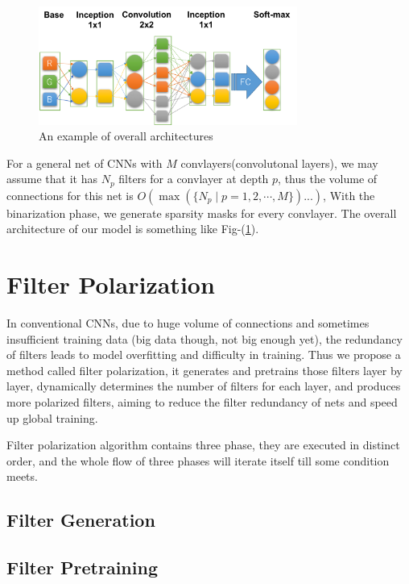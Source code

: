 \documentclass[conference]{IEEEtran}
\begin{document}
\begin{figure}
\centering
\includegraphics[width=85mm]{paper_res/arch.png}
\caption{An example of overall architectures}
\label{fig:net}
\end{figure}

For a general net of CNNs with $M$ convlayers(convolutonal layers),
we may assume that it has $N_{p}$ filters for a convlayer at depth $p$,
thus the volume of connections for this net is $O(\max(\{N_p\mid p=1,2,\cdots,M\})...)$,
With the binarization phase, we generate sparsity masks for every convlayer.
The overall architecture of our model is something like Fig-(\ref{fig:net}).


\section{Filter Polarization}
In conventional CNNs, due to huge volume of connections and sometimes insufficient training
data (big data though, not big enough yet), the redundancy of filters leads to model
overfitting and difficulty in training\cite{jaderberg2014speeding,chen2015compressing}.
Thus we propose a method called filter polarization,
it generates and pretrains those filters layer by layer, dynamically
determines the number of filters for each layer, and produces more polarized filters,
aiming to reduce the filter redundancy of nets and speed up global training.

Filter polarization algorithm contains three phase, they are executed in distinct order,
and the whole flow of three phases will iterate itself till some condition meets.

\subsection{Filter Generation}




\subsection{Filter Pretraining}
\end{document}
